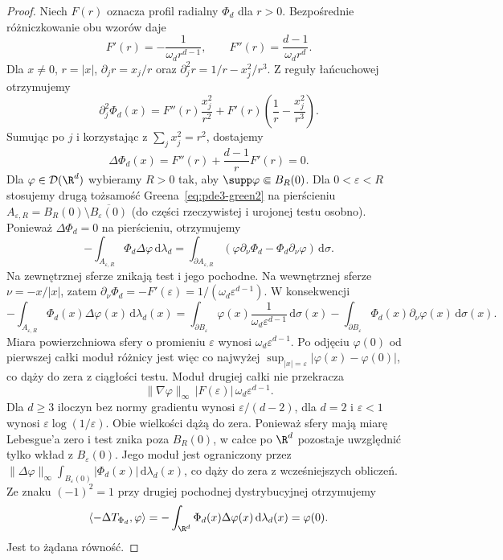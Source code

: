 \begin{proof}
Niech $F(r)$ oznacza profil radialny $\Phi_d$ dla $r>0$.
Bezpośrednie różniczkowanie obu wzorów daje
\[
 F'(r)=-\frac1{\omega_dr^{d-1}},\qquad
 F''(r)=\frac{d-1}{\omega_dr^d}.
\]
Dla $x\ne0$, $r=|x|$,
$\partial_jr=x_j/r$ oraz
$\partial_j^2r=1/r-x_j^2/r^3$.
Z reguły łańcuchowej otrzymujemy
\[
 \partial_j^2\Phi_d(x)
 =F''(r)\frac{x_j^2}{r^2}
 +F'(r)\left(\frac1r-\frac{x_j^2}{r^3}\right).
\]
Sumując po $j$ i korzystając z $\sum_j x_j^2=r^2$,
dostajemy
\[
 \Delta\Phi_d(x)
 =F''(r)+\frac{d-1}{r}F'(r)=0.
\]
Dla $\varphi\in\mathcal D(\R^d)$ wybieramy $R>0$
tak, aby $\supp\varphi\Subset B_R(0)$.
Dla $0<\varepsilon<R$ stosujemy drugą tożsamość
Greena~\eqref{eq:pde3-green2} na pierścieniu
$A_{\varepsilon,R}=B_R(0)\setminus\overline{B_\varepsilon(0)}$
(do części rzeczywistej i urojonej testu osobno).
Ponieważ $\Delta\Phi_d=0$ na pierścieniu,
otrzymujemy
\[
 -\int_{A_{\varepsilon,R}}\Phi_d\Delta\varphi
 \,\mathrm d\lambda_d
 =\int_{\partial A_{\varepsilon,R}}
 (\varphi\partial_\nu\Phi_d-\Phi_d\partial_\nu\varphi)
 \,\mathrm d\sigma.
\]
Na zewnętrznej sferze znikają test i jego pochodne.
Na wewnętrznej sferze $\nu=-x/|x|$, zatem
$\partial_\nu\Phi_d=-F'(\varepsilon)
=1/(\omega_d\varepsilon^{d-1})$.
W konsekwencji
\[
 -\int_{A_{\varepsilon,R}}\Phi_d(x)\Delta\varphi(x)
 \,\mathrm d\lambda_d(x)
 =\int_{\partial B_\varepsilon}\varphi(x)
 \frac{1}{\omega_d\varepsilon^{d-1}}\,\mathrm d\sigma(x)
 -\int_{\partial B_\varepsilon}\Phi_d(x)
 \partial_\nu\varphi(x)\,\mathrm d\sigma(x).
\]
Miara powierzchniowa sfery o promieniu $\varepsilon$
wynosi $\omega_d\varepsilon^{d-1}$. Po odjęciu
$\varphi(0)$ od pierwszej całki moduł różnicy
jest więc co najwyżej
$\sup_{|x|=\varepsilon}|\varphi(x)-\varphi(0)|$,
co dąży do zera z ciągłości testu.
Moduł drugiej całki nie przekracza
\[
 \|\nabla\varphi\|_\infty\,
 |F(\varepsilon)|\,\omega_d\varepsilon^{d-1}.
\]
Dla $d\ge3$ iloczyn bez normy gradientu wynosi
$\varepsilon/(d-2)$, dla $d=2$ i $\varepsilon<1$
wynosi $\varepsilon\log(1/\varepsilon)$.
Obie wielkości dążą do zera.
Ponieważ sfery mają miarę Lebesgue'a zero
i test znika poza $B_R(0)$, w całce po $\R^d$
pozostaje uwzględnić tylko wkład z $B_\varepsilon(0)$.
Jego moduł jest ograniczony przez
$\|\Delta\varphi\|_\infty
\int_{B_\varepsilon(0)}|\Phi_d(x)|\,\mathrm d\lambda_d(x)$,
co dąży do zera z wcześniejszych obliczeń.
Ze znaku $(-1)^2=1$ przy drugiej pochodnej
dystrybucyjnej otrzymujemy
\[
 \langle-\Delta T_{\Phi_d},\varphi\rangle
 =-\int_{\R^d}\Phi_d(x)\Delta\varphi(x)
 \,\mathrm d\lambda_d(x)=\varphi(0).
\]
Jest to żądana równość.
\end{proof}

